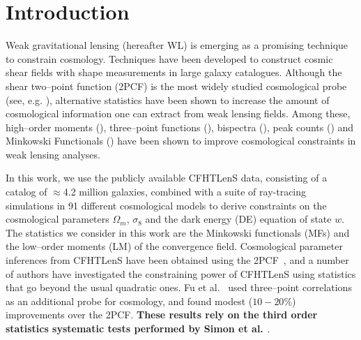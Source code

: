 \documentclass[reprint,aps,prd,superscriptaddress,showkeys,showpacs]{revtex4-1}
\begin{document}

\maketitle



\section{Introduction}

Weak gravitational lensing (hereafter WL) is emerging as a promising
technique to constrain cosmology. Techniques have been developed to
construct cosmic shear fields with shape measurements in large galaxy
catalogues. Although the shear two--point function (2PCF) is the most
widely studied cosmological probe (see, e.g. \citep{CFHTKilbinger}),
alternative statistics have been shown to increase the amount of
cosmological information one can extract from weak lensing
fields. Among these, high--order moments
(\citep{moments1,moments2,moments3,moments4,moments5}),
three--point functions (\citep{3pcf1,3pcf2,3pcf3}), bispectra
(\citep{bispectrum1,bispectrum2,bispectrum3,bispectrum4}), peak counts
(\citep{peaks1,peaks2,peaks3,peaks4,peaks5,peaks6,peaks7,peaks8}) and Minkowski
Functionals (\citep{MinkJan,Petri2013}) have been shown to improve
cosmological constraints in weak lensing analyses.

In this work, we use the publicly available CFHTLenS data, consisting
of a catalog of $\approx$4.2 million galaxies, combined with a suite
of ray-tracing simulations in 91 different cosmological models to
derive constraints on the cosmological parameters $\Omega_m$,
$\sigma_8$ and the dark energy (DE) equation of state $w$.  The
statistics we consider in this work are the Minkowski functionals
(MFs) and the low--order moments (LM) of the convergence field.
Cosmological parameter inferences from CFHTLenS have been obtained
using the 2PCF~\citep{CFHTKilbinger}, and a number of authors have
investigated the constraining power of CFHTLenS using statistics that
go beyond the usual quadratic ones. Fu et al.~\citep{CFHTFu} used
three--point correlations as an additional probe for cosmology, and
found modest ($10-20\%$) improvements over the 2PCF. \textbf{These results rely on the third order statistics systematic tests performed by Simon et al. \citep{CFHTSimon}}.  
\end{document}
